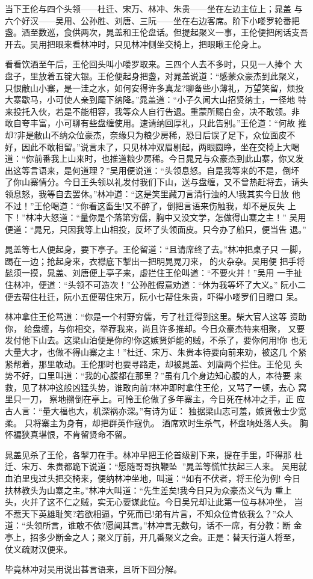 当下王伦与四个头领——杜迁、宋万、林冲、朱贵——坐在左边主位上；晁盖
与六个好汉——吴用、公孙胜、刘唐、三阮——坐在右边客席。阶下小喽罗轮番把
盏。酒至数巡，食供两次，晁盖和王伦盘话。但提起聚义一事，王伦便把闲话支吾
开去。吴用把眼来看林冲时，只见林冲侧坐交椅上，把眼瞅王伦身上。

看看饮酒至午后，王伦回头叫小喽罗取来。三四个人去不多时，只见一人捧个
大盘子，里放着五锭大银。王伦便起身把盏，对晁盖说道：“感蒙众豪杰到此聚义，
只恨敝山小寨，是一洼之水，如何安得许多真龙?聊备些小薄礼，万望笑留，烦投
大寨歇马，小可使人亲到麾下纳降。”晁盖道：“小子久闻大山招贤纳士，一径地
特来投托入伙，若是不能相容，我等众人自行告退。重蒙所赐白金，决不敢领。非
敢自夸丰富，小可聊有些盘缠使用。速请纳回厚礼，只此告别。”王伦道：“何故
推却?非是敝山不纳众位豪杰，奈缘只为粮少房稀，恐日后误了足下，众位面皮不
好，因此不敢相留。”说言未了，只见林冲双眉剔起，两眼圆睁，坐在交椅上大喝
道：“你前番我上山来时，也推道粮少房稀。今日晁兄与众豪杰到此山寨，你又发
出这等言语来，是何道理？”吴用便说道：“头领息怒。自是我等来的不是，倒坏
了你山寨情分。今日王头领以礼发付我们下山，送与盘缠，又不曾热赶将去，请头
领息怒，我等自去罢休。”林冲道：“这是笑里藏刀言清行浊的人!我其实今日放
他不过！”王伦喝道：“你看这畜生!又不醉了，倒把言语来伤触我，却不是反失
上下！”林冲大怒道：“量你是个落第穷儒，胸中又没文学，怎做得山寨之主！”
吴用便道：“晁兄，只因我等上山相投，反坏了头领面皮。只今办了船只，便当告
退。”

晁盖等七人便起身，要下亭子。王伦留道：“且请席终了去。”林冲把桌子只
一脚，踢在一边；抢起身来，衣襟底下掣出一把明晃晃刀来，的火杂杂。吴用便
把手将髭须一摸，晁盖、刘唐便上亭子来，虚拦住王伦叫道：“不要火并！”吴用
一手扯住林冲，便道：“头领不可造次！”公孙胜假意劝道：“休为我等坏了大义。”
阮小二便去帮住杜迁，阮小五便帮住宋万，阮小七帮住朱贵，吓得小喽罗们目瞪口
呆。

林冲拿住王伦骂道：“你是一个村野穷儒，亏了杜迁得到这里。柴大官人这等
资助你，给盘缠，与你相交，举荐我来，尚且许多推却。今日众豪杰特来相聚，
又要发付他下山去。这梁山泊便是你的!你这嫉贤妒能的贼，不杀了，要你何用!你
也无大量大才，也做不得山寨之主！”杜迁、宋万、朱贵本待要向前来劝，被这几
个紧紧帮着，那里敢动。王伦那时也要寻路走，却被晁盖、刘唐两个拦住。王伦见
头势不好，口里叫道：“我的心腹都在那里？”虽有几个身边知心腹的人，本待要
来救，见了林冲这般凶猛头势，谁敢向前?林冲即时拿住王伦，又骂了一顿，去心
窝里只一刀，察地搠倒在亭上。可怜王伦做了多年寨主，今日死在林冲之手，正
应古人言：“量大福也大，机深祸亦深。”有诗为证：
独据梁山志可羞，嫉贤傲士少宽柔。
只将寨主为身有，却把群英作寇仇。
酒席欢时生杀气，杯盘响处落人头。
胸怀褊狭真堪恨，不肯留贤命不留。

晁盖见杀了王伦，各掣刀在手。林冲早把王伦首级割下来，提在手里，吓得那
杜迁、宋万、朱贵都跪下说道：“愿随哥哥执鞭坠！”晁盖等慌忙扶起三人来。
吴用就血泊里曳过头把交椅来，便纳林冲坐地，叫道：“如有不伏者，将王伦为例!
今日扶林教头为山寨之主。”林冲大叫道：“先生差矣!我今日只为众豪杰义气为
重上头，火并了这不仁之贼，实无心要谋此位。今日吴兄却让此第一位与林冲坐，
岂不惹天下英雄耻笑?若欲相逼，宁死而已!弟有片言，不知众位肯依我么？”众人
道：“头领所言，谁敢不依?愿闻其言。”林冲言无数句，话不一席，有分教：断
金亭上，招多少断金之人；聚义厅前，开几番聚义之会。正是：替天行道人将至，
仗义疏财汉便来。

毕竟林冲对吴用说出甚言语来，且听下回分解。